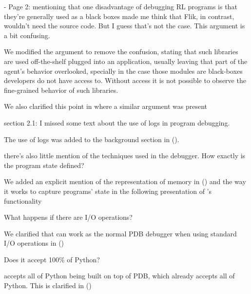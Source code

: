\begin{remark} 
- Page 2: mentioning that one disadvantage of debugging RL programs is that they're generally used as a black boxes made me think that Flik, in contrast, wouldn't need the source code. But I guess that's not the case. This argument is a bit confusing.
\end{remark}
\begin{solved}
We modified the argument to remove the confusion, stating that such libraries are used off-the-shelf plugged into an application, usually leaving that part of the agent's behavior overlooked, specially in the case those modules are black-boxes developers do not have access to. Without access it is not possible to observe the fine-grained behavior of such libraries.

We also clarified this point in  where a similar argument was present
\end{solved}

\begin{remark}\label{rem:logs}
section 2.1: I missed some text about the use of logs in program debugging.
\end{remark}
\begin{solved}
The use of logs was added to the background section in  ().
\end{solved}

\begin{remark} \label{rem:state}
there's also little mention of the techniques used in the debugger.
How exactly is the program state defined?
\end{remark}
\begin{solved}
We added an explicit mention of the representation of memory in \flik () and the way it works to capture programs' state in the following presentation of \flik's functionality
\end{solved}

\begin{remark} \label{rem:python-io}
What happens if there are I/O operations?
\end{remark}
\begin{solved}
We clarified that \flik can work as the normal \ac{PDB} debugger when using standard I/O operations in  ()
\end{solved}

\begin{remark} \label{rem:python-full}
Does it accept 100\% of Python? 
\end{remark}
\begin{solved}
\flik accepts all of Python being built on top of PDB, which already accepts all of Python. This is clarified in  ()
\end{solved}

